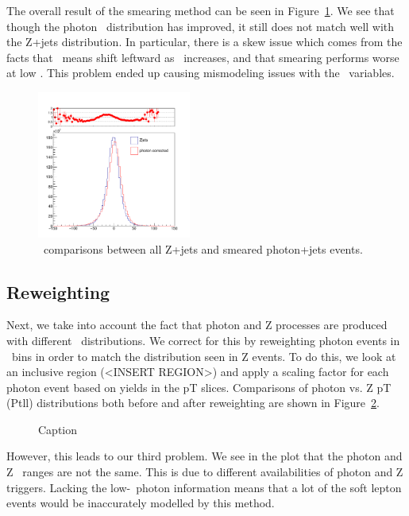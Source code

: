 The overall result of the smearing method can be seen in Figure~\ref{fig:Z_photon_eta_total}. We see that though the photon \METl\ distribution has improved, it still does not match well with the Z+jets distribution. In particular, there is a skew issue which comes from the facts that \METl\ means shift leftward as \pt\ increases, and that smearing performs worse at low \pt. This problem ended up causing mismodeling issues with the \MET\ variables.

\begin{figure}[htbp]
    \centering
    \includegraphics[width=0.45\textwidth]{Images/SUSY/METl_total.pdf}
    \caption{\METl\ comparisons between all Z+jets and smeared photon+jets events.}
    \label{fig:Z_photon_eta_total}
\end{figure}

\subsection*{Reweighting}

Next, we take into account the fact that photon and Z processes are produced with different \pt\ distributions. We correct for this by reweighting photon events in \pt\ bins in order to match the distribution seen in Z events. To do this, we look at an inclusive region (<INSERT REGION>) and apply a scaling factor for each photon event based on yields in the pT slices. Comparisons of photon vs. Z pT (Ptll) distributions both before and after reweighting are shown in Figure~\ref{fig:reweighting}.

\begin{figure}[hbtp]
    \centering
    \caption{Caption}
    \label{fig:reweighting}
\end{figure}

However, this leads to our third problem. We see in the plot that the photon and Z \pt\ ranges are not the same. This is due to different availabilities of photon and Z triggers. Lacking the low-\pt\ photon information means that a lot of the soft lepton events would be inaccurately modelled by this method.


